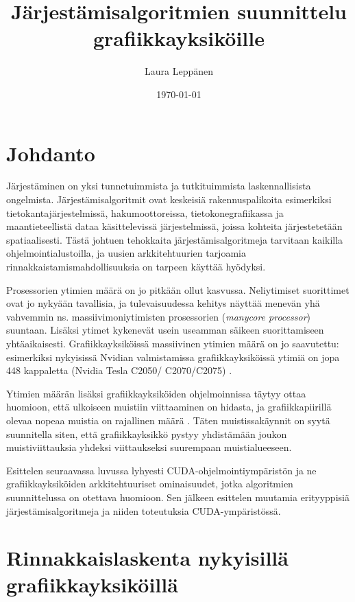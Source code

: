 \documentclass[a4paper,11pt]{article}
\newcommand{\engl}[1]{\foreignlanguage{english}{\em #1}}
\begin{document}
\title{Järjestämisalgoritmien suunnittelu grafiikkayksiköille}
\author{Laura Leppänen}
\date{\today}
\maketitle
\thispagestyle{empty}

\tableofcontents
\onehalfspacing

\newpage
\setcounter{page}{1}

\section{Johdanto}

Järjestäminen on yksi tunnetuimmista ja tutkituimmista laskennallisista ongelmista. Järjestämisalgoritmit ovat keskeisiä rakennuspalikoita esimerkiksi tietokantajärjestelmissä, hakumoottoreissa, tietokonegrafiikassa ja maantieteellistä dataa käsittelevissä järjestelmissä, joissa kohteita järjestetetään spatiaalisesti. Tästä johtuen tehokkaita järjestämisalgoritmeja tarvitaan kaikilla ohjelmointialustoilla, ja uusien arkkitehtuurien tarjoamia rinnakkaistamismahdollisuuksia on tarpeen käyttää hyödyksi.

Prosessorien ytimien määrä on jo pitkään ollut kasvussa. Neliytimiset suorittimet ovat jo nykyään tavallisia, ja tulevaisuudessa kehitys näyttää menevän yhä vahvemmin ns. massiivimoniytimisten prosessorien (\engl{manycore processor}) suuntaan. Lisäksi ytimet kykenevät usein useamman säikeen suorittamiseen yhtäaikaisesti. Grafiikkayksiköissä massiivinen ytimien määrä on jo saavutettu: esimerkiksi nykyisissä Nvidian valmistamissa grafiikkayksiköissä ytimiä on jopa 448 kappaletta (Nvidia Tesla C2050/ C2070/C2075) \cite{nvidiafermi2010}.

Ytimien määrän lisäksi grafiikkayksiköiden ohjelmoinnissa täytyy ottaa huomioon, että ulkoiseen muistiin viittaaminen on hidasta, ja grafiikkapiirillä olevaa nopeaa muistia on rajallinen määrä \cite{leischner2010}. Täten muistissakäynnit on syytä suunnitella siten, että grafiikkayksikkö pystyy yhdistämään joukon muistiviittauksia yhdeksi viittaukseksi suurempaan muistialueeseen.

Esittelen seuraavassa luvussa lyhyesti CUDA-ohjelmointiympäristön ja ne grafiikkayksiköiden arkkitehtuuriset ominaisuudet, jotka algoritmien suunnittelussa on otettava huomioon. Sen jälkeen esittelen muutamia erityyppisiä järjestämisalgoritmeja ja niiden toteutuksia CUDA-ympäristössä.

\section{Rinnakkaislaskenta nykyisillä grafiikkayksiköillä}
\end{document}
